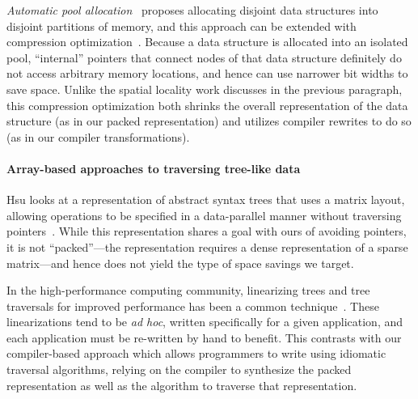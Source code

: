 \emph{Automatic pool allocation}~\cite{Lattner2005} proposes
allocating disjoint data structures into disjoint partitions of
memory, and this approach can be extended with compression
optimization~\cite{Lattner2005mspc}. Because a data structure is
allocated into an isolated pool, ``internal'' pointers that connect
nodes of that data structure definitely do not access arbitrary memory
locations, and hence can use narrower bit widths to save space. Unlike
the spatial locality work discusses in the previous paragraph, this
compression optimization both shrinks the overall representation of
the data structure (as in our packed representation) and utilizes
compiler rewrites to do so (as in our compiler transformations).


\paragraph{Array-based approaches to traversing tree-like data}

Hsu looks at a representation of abstract syntax trees that uses a matrix
layout, allowing operations to be specified in a data-parallel manner without
traversing pointers~\cite{hsu2016key}. While this representation shares a goal
with ours of avoiding pointers, it is not ``packed''---the representation
requires a dense representation of a sparse matrix---and hence does not yield
the type of space savings we target.

In the high-performance computing community, linearizing trees and tree traversals for improved
performance has been a common technique~\cite{makino90,goldfarb13sc}. These
linearizations tend to be {\em ad hoc}, written specifically for a given
application, and each application must be re-written by hand to benefit. This
contrasts with our compiler-based approach which allows programmers to write
using idiomatic traversal algorithms, relying on the compiler to synthesize
the packed representation as well as the algorithm to traverse that
representation.

